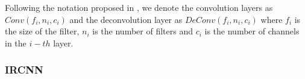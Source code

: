 Following the notation proposed in \cite{fsrcnn}, we denote the convolution layers as $Conv(f_i, n_i, c_i)$ and the deconvolution layer as $DeConv(f_i, n_i, c_i)$ where $f_i$ is the size of the filter, $n_i$ is the number of filters and $c_i$ is the number of channels in the $i-th$ layer.

\subsubsection{IRCNN}
